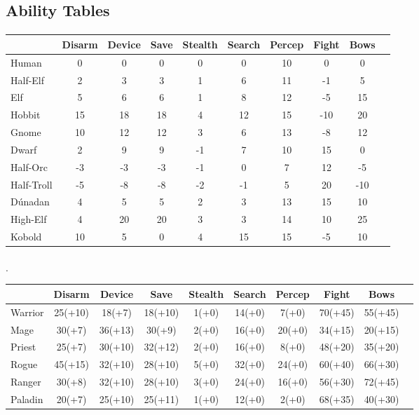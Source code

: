 \subsection{Ability Tables}
\paragraph{}
\begin{tabular}{|l|c|c|c|c|c|c|c|c|c|}
\hline
        & Disarm & Device & Save & Stealth & Search & Percep & Fight &
        Bows\\
\hline
Human      & 0  &  0 & 0  &  0 &  0 & 10 &  0  &  0\\
Half-Elf   & 2  &  3 & 3  &  1 &  6 & 11 & -1  &  5\\
Elf        & 5  &  6 & 6  &  1 &  8 & 12 & -5  & 15\\
Hobbit     & 15 & 18 & 18 &  4 & 12 & 15 & -10 & 20\\
Gnome      & 10 & 12 & 12 &  3 &  6 & 13 & -8  & 12\\
Dwarf      & 2  &  9 & 9  & -1 &  7 & 10 & 15  &  0\\
Half-Orc   & -3 & -3 & -3 & -1 &  0 &  7 & 12  & -5\\
Half-Troll & -5 & -8 & -8 & -2 & -1 &  5 & 20  & -10\\
D\'{u}nadan& 4  &  5 & 5  &  2 &  3 & 13 & 15  & 10\\
High-Elf   & 4  & 20 & 20 &  3 &  3 & 14 & 10  & 25\\
Kobold     & 10 &  5 & 0  &  4 & 15 & 15 & -5  & 10\\
\hline
\end{tabular}

\paragraph{}.\\
\begin{tabular}{|l|c|c|c|c|c|c|c|c|c|}
\hline
    & Disarm & Device & Save & Stealth & Search & Percep & Fight &
    Bows\\
\hline
Warrior&25(+10) & 18(+7)  & 18(+10) & 1(+0) & 14(+0) & 7(+0)  & 70(+45) & 55(+45)\\
Mage   &30(+7)  & 36(+13) & 30(+9)  & 2(+0) & 16(+0) & 20(+0) & 34(+15) & 20(+15)\\
Priest &25(+7)  & 30(+10) & 32(+12) & 2(+0) & 16(+0) & 8(+0)  & 48(+20)
& 35(+20)\\
Rogue  &45(+15) & 32(+10) & 28(+10) & 5(+0) & 32(+0) & 24(+0) & 60(+40)
& 66(+30)\\
Ranger &30(+8)  & 32(+10) & 28(+10) & 3(+0) & 24(+0) & 16(+0) & 56(+30)
& 72(+45)\\
Paladin&20(+7)  & 25(+10) & 25(+11) & 1(+0) & 12(+0) & 2(+0)  & 68(+35)
& 40(+30)\\
\hline
\end{tabular}

